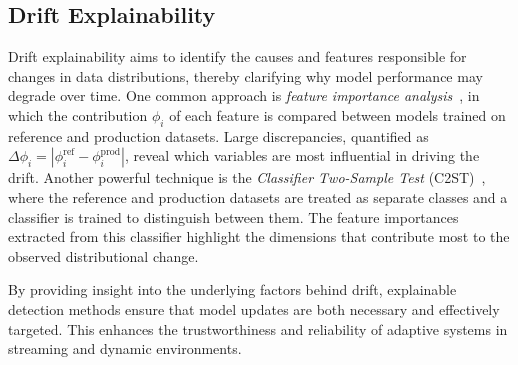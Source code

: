 \subsection{Drift Explainability}\label{sec:drift_explainability}

Drift explainability aims to identify the causes and features responsible for
changes in data distributions, thereby clarifying why model performance may
degrade over time. One common approach is \emph{feature importance
    analysis}~\cite{feture_importance_for_drift_explainabilty}, in which the
contribution $\phi_i$ of each feature is compared between models trained on
reference and production datasets. Large discrepancies, quantified as $\Delta
    \phi_i = |\phi_i^{\text{ref}} - \phi_i^{\text{prod}}|$, reveal which variables
are most influential in driving the drift. Another powerful technique is the
\emph{Classifier Two-Sample Test}
(C2ST)~\cite{revisiting_two_sample_classifier}, where the reference and
production datasets are treated as separate classes and a classifier is trained
to distinguish between them. The feature importances extracted from this
classifier highlight the dimensions that contribute most to the observed
distributional change.

By providing insight into the underlying factors behind drift, explainable
detection methods ensure that model updates are both necessary and effectively
targeted. This enhances the trustworthiness and reliability of adaptive systems
in streaming and dynamic environments.
